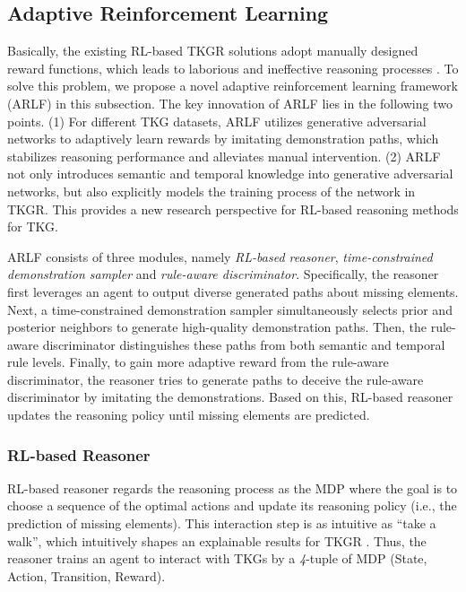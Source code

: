 \documentclass[sigconf,natbib=true]{acmart}
\begin{document}
\subsection{Adaptive Reinforcement Learning}

Basically, the existing RL-based TKGR solutions adopt manually designed reward functions,  which leads to  laborious and ineffective reasoning processes \cite{rewardRL, MultiHop, rewardRLcon}. To solve this problem, we propose a novel adaptive reinforcement learning framework (ARLF) in this subsection. The key innovation of ARLF lies in the following two points. (1) For different TKG datasets, ARLF utilizes generative adversarial networks to adaptively learn rewards by imitating demonstration paths, which stabilizes reasoning performance and alleviates  manual intervention. (2) ARLF not only introduces semantic and temporal knowledge into generative adversarial networks, but also explicitly models the training process of the network in TKGR. This provides a new research  perspective for RL-based reasoning methods  for TKG.

ARLF consists of three modules, namely \emph{RL-based reasoner}, \emph{time-constrained demonstration sampler} and \emph{rule-aware discriminator}. Specifically, the reasoner first leverages an agent to output diverse generated paths about missing elements. Next, a time-constrained demonstration sampler simultaneously selects prior and posterior neighbors to generate high-quality demonstration paths. Then, the rule-aware discriminator distinguishes these paths from both semantic and temporal rule levels. Finally, to gain more adaptive reward from the rule-aware discriminator, the reasoner tries to generate paths to deceive the rule-aware discriminator by imitating the demonstrations. Based on this, RL-based reasoner updates the reasoning policy until missing elements are predicted.

\subsubsection{RL-based Reasoner}
RL-based reasoner regards the reasoning process as the MDP where the goal is to choose a sequence of the optimal actions  
 and update its reasoning policy (i.e., the prediction of missing elements). This interaction step  is as intuitive as “take a walk”, which intuitively shapes an explainable results for TKGR \cite{MINERVA}.  Thus, the reasoner trains an agent to interact with TKGs by a \emph{4}-tuple of MDP (State, Action, Transition, Reward). %
\end{document}

